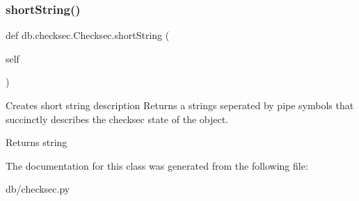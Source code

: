 \subsubsection{\texorpdfstring{short\+String()}{shortString()}}
{\footnotesize\ttfamily def db.\+checksec.\+Checksec.\+short\+String (\begin{DoxyParamCaption}\item[{}]{self }\end{DoxyParamCaption})}



Creates short string description Returns a strings seperated by pipe symbols that succinctly describes the checksec state of the object. 

\begin{DoxyReturn}{Returns}
string 
\end{DoxyReturn}


The documentation for this class was generated from the following file\+:\begin{DoxyCompactItemize}
\item 
db/checksec.\+py\end{DoxyCompactItemize}
